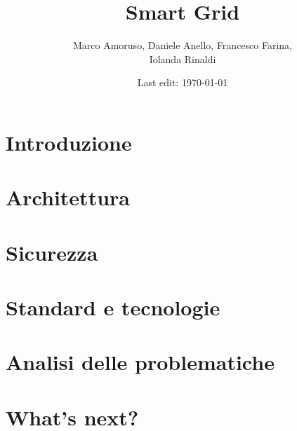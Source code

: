 \documentclass[11pt,oneside]{book}
\title{Smart Grid} %
\author{Marco Amoruso, Daniele Anello, Francesco Farina, \\Iolanda Rinaldi } %
\date{Last edit: \today} %
\newcommand{\initial}[1]{ %
\lettrine[lines=3,lhang=0.3,nindent=0em]{
\color{DarkGoldenrod}
{\textsf{#1}}}{}}
\begin{document}
\maketitle %

\thispagestyle{fancy} %



\tableofcontents
\chapter{Introduzione}

\chapter{Architettura}

\chapter{Sicurezza}

\chapter{Standard e tecnologie}

\chapter{Analisi delle problematiche}

\chapter{What's next?}

\end{document}
